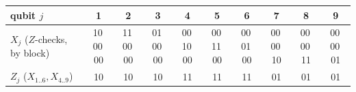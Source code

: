 \begin{tabular}{@{}lccccccccc@{}}\toprule
qubit $j$ & 1 & 2 & 3 & 4 & 5 & 6 & 7 & 8 & 9\\
\midrule
$X_j$ ($Z$-checks, by block) & 10\,00\,00 & 11\,00\,00 & 01\,00\,00 & 00\,10\,00 & 00\,11\,00 & 00\,01\,00 & 00\,00\,10 & 00\,00\,11 & 00\,00\,01\\
$Z_j$ ($X_{1..6},X_{4..9}$) & 10 & 10 & 10 & 11 & 11 & 11 & 01 & 01 & 01\\
\bottomrule\end{tabular}
